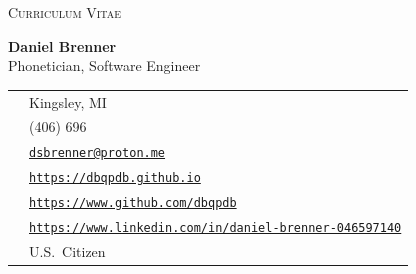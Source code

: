 \centerline{\large\textsc{Curriculum Vitae}}
\vspace{.5cm}
\noindent\Large\textbf{Daniel Brenner} \\
\large Phonetician, Software Engineer \\

\noindent
\begin{tabular}{c l}
	\faMapMarker* & Kingsley, MI \\
	\faPhoneSquare* & (406) 696\textendash 7069 \\
	\faEnvelope & \href{mailto:dsbrenner@proton.me}{\texttt{dsbrenner@proton.me}} \\
	\faGlobe & \href{https://dbqpdb.github.io}{\texttt{https://dbqpdb.github.io}} \\
	\faGithub & \href{https://www.github.com/dbqpdb}{\texttt{https://www.github.com/dbqpdb}} \\
	\faLinkedin & \href{https://www.linkedin.com/in/daniel-brenner-046597140}{\texttt{https://www.linkedin.com/in/daniel-brenner-046597140}} \\
	\faPassport & U.S.\ Citizen
\end{tabular}
